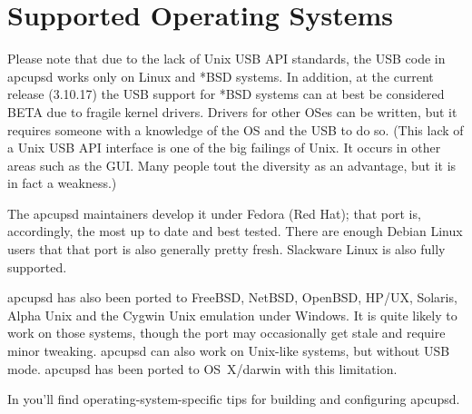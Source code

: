 \label{Supported-Operating-Systems_003b}
\section*{Supported Operating Systems}

\label{index-Supported-OSes-8}
\label{index-OSes-Supported-9}
Please note that due to the lack of Unix USB API standards, the USB code in
apcupsd works only on Linux and *BSD systems. In addition, at the current
release (3.10.17) the USB support for *BSD systems can at best be considered
BETA due to fragile kernel drivers. Drivers for other OSes can be written, but
it requires someone with a knowledge of the OS and the USB to do so.  (This
lack of a Unix USB API interface is one of the big failings of Unix.  It
occurs in other areas such as the GUI. Many people tout the diversity as an
advantage, but it is in fact a weakness.)  

The apcupsd maintainers develop it under Fedora (Red Hat); that port is,
accordingly, the most up to date and best tested.  There are enough Debian
Linux users that that port is also generally pretty fresh.  Slackware Linux is
also fully supported.  

apcupsd has also been ported to FreeBSD, NetBSD, OpenBSD, HP/UX, Solaris,
Alpha Unix and the Cygwin Unix emulation under Windows. It is quite likely to
work on those systems, though the port may occasionally get stale and require
minor tweaking.  apcupsd can also work on Unix-like systems, but without
USB mode.  apcupsd has been ported to OS~X/darwin with this limitation.

In 
you'll find operating-system-specific tips for building and configuring
apcupsd.  
